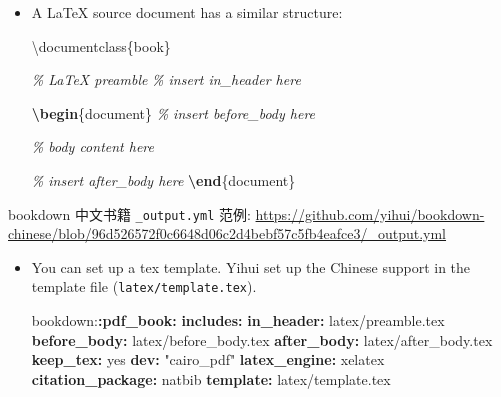 \documentclass[
]{book}
\newenvironment{Shaded}{\begin{snugshade}}{\end{snugshade}}
\newcommand{\AttributeTok}[1]{\textcolor[rgb]{0.13,0.29,0.53}{#1}}
\newcommand{\BuiltInTok}[1]{#1}
\newcommand{\CharTok}[1]{\textcolor[rgb]{0.31,0.60,0.02}{#1}}
\newcommand{\CommentTok}[1]{\textcolor[rgb]{0.56,0.35,0.01}{\textit{#1}}}
\newcommand{\ExtensionTok}[1]{#1}
\newcommand{\FunctionTok}[1]{\textcolor[rgb]{0.13,0.29,0.53}{\textbf{#1}}}
\newcommand{\KeywordTok}[1]{\textcolor[rgb]{0.13,0.29,0.53}{\textbf{#1}}}
\newcommand{\NormalTok}[1]{#1}
\newcommand{\StringTok}[1]{\textcolor[rgb]{0.31,0.60,0.02}{#1}}
\theoremstyle{definition}
\theoremstyle{definition}
\theoremstyle{definition}
\theoremstyle{definition}
\theoremstyle{remark}
\begin{document}
\begin{itemize}
  \begin{itemize}
  \item
    A LaTeX source document has a similar structure:

\begin{Shaded}
\begin{Highlighting}[]
\BuiltInTok{\textbackslash{}documentclass}\NormalTok{\{}\ExtensionTok{book}\NormalTok{\}}

\CommentTok{\% LaTeX preamble}
\CommentTok{\% insert in\_header here}

\KeywordTok{\textbackslash{}begin}\NormalTok{\{}\ExtensionTok{document}\NormalTok{\}}
\CommentTok{\% insert before\_body here}

\CommentTok{\% body content here}

\CommentTok{\% insert after\_body here}
\KeywordTok{\textbackslash{}end}\NormalTok{\{}\ExtensionTok{document}\NormalTok{\}}
\end{Highlighting}
\end{Shaded}
  \end{itemize}
\end{itemize}

bookdown 中文书籍 \texttt{\_output.yml} 范例: \url{https://github.com/yihui/bookdown-chinese/blob/96d526572f0c6648d06c2d4bebf57c5fb4eafce3/_output.yml}

\begin{itemize}
\item
  You can set up a tex template.
  Yihui set up the Chinese support in the template file (\texttt{latex/template.tex}).

\begin{Shaded}
\begin{Highlighting}[]
\AttributeTok{bookdown:}\FunctionTok{:pdf\_book}\KeywordTok{:}
\AttributeTok{  }\FunctionTok{includes}\KeywordTok{:}
\AttributeTok{    }\FunctionTok{in\_header}\KeywordTok{:}\AttributeTok{ latex/preamble.tex}
\AttributeTok{    }\FunctionTok{before\_body}\KeywordTok{:}\AttributeTok{ latex/before\_body.tex}
\AttributeTok{    }\FunctionTok{after\_body}\KeywordTok{:}\AttributeTok{ latex/after\_body.tex}
\AttributeTok{  }\FunctionTok{keep\_tex}\KeywordTok{:}\AttributeTok{ }\CharTok{yes}
\AttributeTok{  }\FunctionTok{dev}\KeywordTok{:}\AttributeTok{ }\StringTok{"cairo\_pdf"}
\AttributeTok{  }\FunctionTok{latex\_engine}\KeywordTok{:}\AttributeTok{ xelatex}
\AttributeTok{  }\FunctionTok{citation\_package}\KeywordTok{:}\AttributeTok{ natbib}
\AttributeTok{  }\FunctionTok{template}\KeywordTok{:}\AttributeTok{ latex/template.tex}
\end{Highlighting}
\end{Shaded}
\end{itemize}
\end{document}
